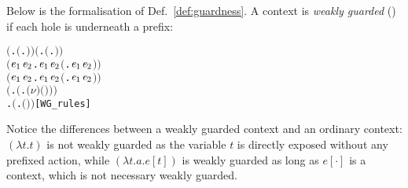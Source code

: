 Below is the formalisation  of Def.~\ref{def:guardness}.
A context is \emph{weakly guarded} () if each hole is underneath a prefix:
\begin{alltt}
\HOLTokenTurnstile{} \ensuremath{(}\HOLSymConst{\HOLTokenForall{}}.  \ensuremath{(}\HOLTokenLambda{}. \ensuremath{)}\ensuremath{)} \HOLSymConst{\HOLTokenConj{}} \ensuremath{(}\HOLSymConst{\HOLTokenForall{}} .   \HOLSymConst{\HOLTokenImp{}}  \ensuremath{(}\HOLTokenLambda{}. \HOLSymConst{\ensuremath{\ldotp}} \ensuremath{)}\ensuremath{)} \HOLSymConst{\HOLTokenConj{}}
   \ensuremath{(}\HOLSymConst{\HOLTokenForall{}}\ensuremath{\HOLBoundVar{e}\sb{\mathrm{1}}} \ensuremath{\HOLBoundVar{e}\sb{\mathrm{2}}}.  \ensuremath{\HOLBoundVar{e}\sb{\mathrm{1}}} \HOLSymConst{\HOLTokenConj{}}  \ensuremath{\HOLBoundVar{e}\sb{\mathrm{2}}} \HOLSymConst{\HOLTokenImp{}}  \ensuremath{(}\HOLTokenLambda{}. \ensuremath{\HOLBoundVar{e}\sb{\mathrm{1}}}  \HOLSymConst{\ensuremath{+}} \ensuremath{\HOLBoundVar{e}\sb{\mathrm{2}}} \ensuremath{)}\ensuremath{)} \HOLSymConst{\HOLTokenConj{}}
   \ensuremath{(}\HOLSymConst{\HOLTokenForall{}}\ensuremath{\HOLBoundVar{e}\sb{\mathrm{1}}} \ensuremath{\HOLBoundVar{e}\sb{\mathrm{2}}}.  \ensuremath{\HOLBoundVar{e}\sb{\mathrm{1}}} \HOLSymConst{\HOLTokenConj{}}  \ensuremath{\HOLBoundVar{e}\sb{\mathrm{2}}} \HOLSymConst{\HOLTokenImp{}}  \ensuremath{(}\HOLTokenLambda{}. \ensuremath{\HOLBoundVar{e}\sb{\mathrm{1}}}  \HOLSymConst{\ensuremath{\mid}} \ensuremath{\HOLBoundVar{e}\sb{\mathrm{2}}} \ensuremath{)}\ensuremath{)} \HOLSymConst{\HOLTokenConj{}}
   \ensuremath{(}\HOLSymConst{\HOLTokenForall{}} .   \HOLSymConst{\HOLTokenImp{}}  \ensuremath{(}\HOLTokenLambda{}. \ensuremath{(\nu}\ensuremath{)} \ensuremath{(} \ensuremath{)}\ensuremath{)}\ensuremath{)} \HOLSymConst{\HOLTokenConj{}}
   \HOLSymConst{\HOLTokenForall{}} .   \HOLSymConst{\HOLTokenImp{}}  \ensuremath{(}\HOLTokenLambda{}.  \ensuremath{(} \ensuremath{)} \ensuremath{)}\hfill{[WG_rules]}
\end{alltt}
Notice the differences between a weakly guarded context and an
ordinary context: $(\lambda t. t)$ is not weakly guarded as the
variable $t$ is directly
exposed without any prefixed action, while $(\lambda t. a.e[t])$ is weakly
guarded as long as $e[\cdot]$ is a context, which is not necessary weakly guarded.


